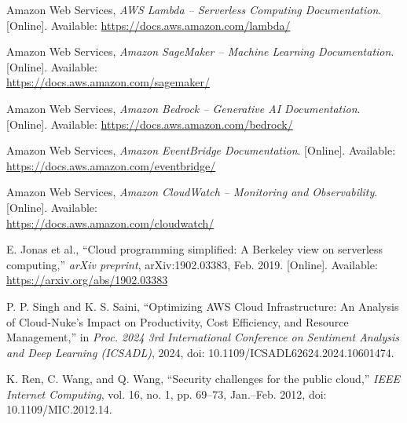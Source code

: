 \documentclass[12pt, a4paper, oneside]{report}
\begin{document}
\begin{enumerate}[leftmargin=1.5cm, label={[\arabic*]}, itemsep=0.3cm]
\justifying

    \item Amazon Web Services, \textit{AWS Lambda -- Serverless Computing Documentation}. [Online]. Available: \url{https://docs.aws.amazon.com/lambda/}

    \item Amazon Web Services, \textit{Amazon SageMaker -- Machine Learning Documentation}. [Online]. Available: \\ \url{https://docs.aws.amazon.com/sagemaker/}

    \item Amazon Web Services, \textit{Amazon Bedrock -- Generative AI Documentation}. [Online]. Available: \url{https://docs.aws.amazon.com/bedrock/}

    \item Amazon Web Services, \textit{Amazon EventBridge Documentation}. [Online]. Available: \url{https://docs.aws.amazon.com/eventbridge/}

    \item Amazon Web Services, \textit{Amazon CloudWatch -- Monitoring and Observability}. [Online]. Available: \\ \url{https://docs.aws.amazon.com/cloudwatch/}

    \item E. Jonas et al., ``Cloud programming simplified: A Berkeley view on serverless computing,'' \textit{arXiv preprint}, arXiv:1902.03383, Feb. 2019. [Online]. Available: \url{https://arxiv.org/abs/1902.03383}

    \item P. P. Singh and K. S. Saini, ``Optimizing AWS Cloud Infrastructure: An Analysis of Cloud-Nuke's Impact on Productivity, Cost Efficiency, and Resource Management,'' in \textit{Proc. 2024 3rd International Conference on Sentiment Analysis and Deep Learning (ICSADL)}, 2024, doi: 10.1109/ICSADL62624.2024.10601474.

   

    \item K. Ren, C. Wang, and Q. Wang, ``Security challenges for the public cloud,'' \textit{IEEE Internet Computing}, vol. 16, no. 1, pp. 69--73, Jan.--Feb. 2012, doi: 10.1109/MIC.2012.14.

\end{enumerate}

\appendix
\end{document}
